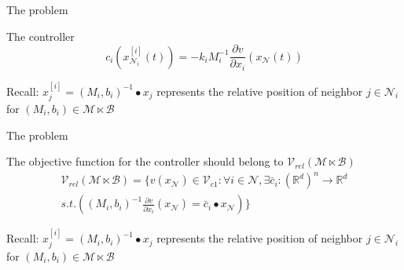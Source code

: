 \documentclass{beamer}
\begin{document}
\begin{frame}{The problem}
	
	\begin{block}{The controller}	
		\begin{equation*}
			c_i\left(x^{[i]}_{\mathcal{N}_i}(t)\right) = -k_iM_i^{-1}\frac{\partial v}{\partial x_i}\left(x_{\mathcal{N}}(t)\right)
		\end{equation*}
	\end{block}
	\begin{alertblock}{Recall:}
		$x_j^{[i]} = (M_i,b_i)^{-1}\bullet x_j $ represents the relative position of neighbor $j\in \mathcal{N}_i$ for $(M_i,b_i) \in \mathcal{M}\ltimes \mathcal{B}$ 
	\end{alertblock}
\end{frame}
\begin{frame}{The problem}
	
	\begin{block}{The objective function for the controller should belong to $\mathcal{V}_{rel}(\mathcal{M}\ltimes\mathcal{B})$}	
		\begin{multline*}
			\mathcal{V}_{rel}(\mathcal{M}\ltimes\mathcal{B}) =\{ v(x_{\mathcal{N}}) \in \mathcal{V}_{c1}:\forall i \in \mathcal{N}, \exists \bar{c}_i: (\mathbb{R}^d)^n \to \mathbb{R}^d \\ s.t.  ((M_i,b_i)^{-1}\frac{\partial v}{\partial x_i} (x_{\mathcal{N}})=\bar{c}_i\bullet x_{\mathcal{N}}) \}
		\end{multline*}
	\end{block}
	\begin{alertblock}{Recall:}
		$x_j^{[i]} = (M_i,b_i)^{-1}\bullet x_j $ represents the relative position of neighbor $j\in \mathcal{N}_i$ for $(M_i,b_i) \in \mathcal{M}\ltimes \mathcal{B}$ 
	\end{alertblock}
\end{frame}
\end{document}
